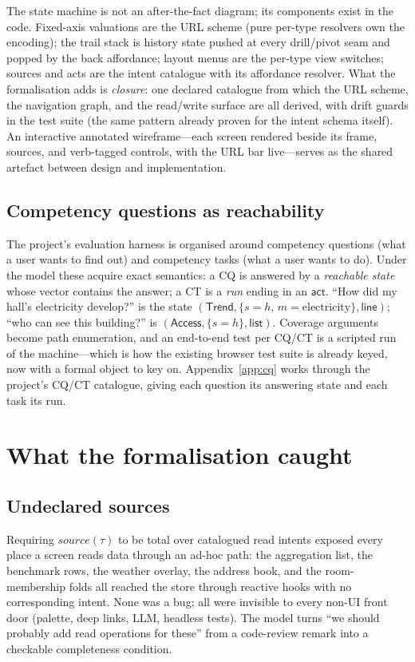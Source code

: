 \documentclass[11pt,a4paper]{article}
\theoremstyle{remark}
\newcommand{\vact}{\mathsf{act}}
\newcommand{\src}{\mathit{source}}
\begin{document}
The state machine is not an after-the-fact diagram; its components exist in the
code. Fixed-axis valuations are the URL scheme (pure per-type resolvers own the
encoding); the trail stack is history state pushed at every drill/pivot seam and
popped by the back affordance; layout menus are the per-type view switches; sources
and acts are the intent catalogue with its affordance resolver. What the
formalisation adds is \emph{closure}: one declared catalogue from which the URL
scheme, the navigation graph, and the read/write surface are all derived, with
drift guards in the test suite (the same pattern already proven for the intent
schema itself). An interactive annotated wireframe---each screen rendered beside
its frame, sources, and verb-tagged controls, with the URL bar live---serves as the
shared artefact between design and implementation.

\subsection{Competency questions as reachability}\label{sec:cq}

The project's evaluation harness is organised around competency questions (what a
user wants to find out) and competency tasks (what a user wants to do). Under the
model these acquire exact semantics: a CQ is answered by a \emph{reachable state}
whose vector contains the answer; a CT is a \emph{run} ending in an $\vact$.
``How did my hall's electricity develop?'' is the state $(\textsf{Trend},
\{s{=}h,\, m{=}\mathrm{electricity}\}, \textsf{line})$; ``who can see this
building?'' is $(\textsf{Access}, \{s{=}h\}, \textsf{list})$. Coverage arguments
become path enumeration, and an end-to-end test per CQ/CT is a scripted run of the
machine---which is how the existing browser test suite is already keyed, now with a
formal object to key on. Appendix~\ref{app:cq} works through the project's CQ/CT
catalogue, giving each question its answering state and each task its run.

\section{What the formalisation caught}\label{sec:caught}

\subsection{Undeclared sources}\label{sec:gaps}

Requiring $\src(\tau)$ to be total over catalogued read intents exposed every place
a screen reads data through an ad-hoc path: the aggregation list, the benchmark
rows, the weather overlay, the address book, and the room-membership folds all
reached the store through reactive hooks with no corresponding intent. None was a
bug; all were invisible to every non-UI front door (palette, deep links, LLM,
headless tests). The model turns ``we should probably add read operations for
these'' from a code-review remark into a checkable completeness condition.
\end{document}
